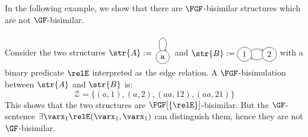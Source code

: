 \noindent
In the following example, we show that there are $\FGF$-bisimilar structures which are not $\GF$-bisimilar.
\begin{example}
  Consider the two structures
  $\str{A} := \tikz[baseline=0.5ex]{\path (0pt,-2.5ex) -- (0pt,-2.5ex); \path[->] (0,0) node[draw,circle] (n1) {a} (n1) edge[loop above,in=70,out=110,looseness=10] (n1);}$ and
  $\str{B} := \tikz[baseline=-0.5ex]{\path[->] (0,0) node (n1) [draw,circle] {1} (3em,0) node (n2) [draw,circle] {2} (n1) edge[bend left] (n2) (n2) edge[bend left] (n1);}$
  with a binary predicate $\relE$ interpreted as the edge relation.
  A $\FGF$-bisimulation between $\str{A}$ and $\str{B}$ is:
  \begin{equation*}
  \mathcal{Z} = \{ (a,1), (a,2), (aa,12), (aa, 21) \}
  \end{equation*}
  This shows that the two structures are $\FGF[\{\relE\}]$-bisimilar.
  But the $\GF$-sentence $\exists{\varx_1}\relE(\varx_1,\varx_1)$ can distinguish them, hence they are not $\GF$-bisimilar.
\end{example}

